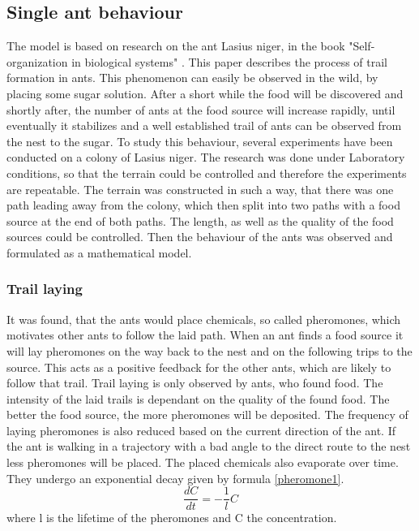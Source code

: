 \subsection{Single ant behaviour}
The model is based on research on the ant Lasius niger, in the book "Self-organization in biological systems" \citep{camazine2003}. This paper describes the process of trail formation in ants. This phenomenon can easily be observed in the wild, by placing some sugar solution. After a short while the food will be discovered and shortly after, the number of ants at the food source will increase rapidly, until eventually it stabilizes and a well established trail of ants can be observed from the nest to the sugar. To study this behaviour, several experiments have been conducted on a colony of Lasius niger. The research was done under Laboratory conditions, so that the terrain could be controlled and therefore the experiments are repeatable. The terrain was constructed in such a way, that there was one path leading away from the colony, which then split into two paths with a food source at the end of both paths. The length, as well as the quality of the food sources could be controlled. Then the behaviour of the ants was observed and formulated as a mathematical model.
\subsubsection{Trail laying}
 It was found, that the ants would place chemicals, so called pheromones, which motivates other ants to follow the laid path. When an ant finds a food source it will lay pheromones on the way back to the nest and on the following trips to the source. This acts as a positive feedback for the other ants, which are likely to follow that trail. Trail laying is only observed by ants, who found food. The intensity of the laid trails is dependant on the quality of the found food. The better the food source, the more pheromones will be deposited. The frequency of laying pheromones is also reduced based on the current direction of the ant. If the ant is walking in a trajectory with a bad angle to the direct route to the nest less pheromones will be placed. The placed chemicals also evaporate over time. They undergo an exponential decay given by formula \ref{pheromone1}.
 \begin{equation} \label{pheromone1}
  \frac{dC}{dt}=-\frac{1}{l}C
 \end{equation}
 where l is the lifetime of the pheromones and C the concentration.
